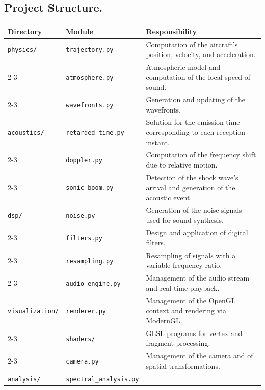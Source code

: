 \documentclass[10.5pt]{article}
\begin{document}
	\subsection{Project Structure.}
	
	\begin{table}[H]
		\centering
		\label{tab:estructura}
		\begin{tabular}{|l|p{4cm}|p{10cm}|}
			\hline
			\textbf{Directory} & \textbf{Module} & \textbf{Responsibility} \\
			\hline
			\texttt{physics/} &
			\texttt{trajectory.py} &
			Computation of the aircraft's position, velocity, and acceleration. \\
			\cline{2-3}
			&
			\texttt{atmosphere.py} &
			Atmospheric model and computation of the local speed of sound. \\
			\cline{2-3}
			&
			\texttt{wavefronts.py} &
			Generation and updating of the wavefronts. \\
			\hline
			\texttt{acoustics/} &
			\texttt{retarded\_time.py} &
			Solution for the emission time corresponding to each reception instant. \\
			\cline{2-3}
			&
			\texttt{doppler.py} &
			Computation of the frequency shift due to relative motion. \\
			\cline{2-3}
			&
			\texttt{sonic\_boom.py} &
			Detection of the shock wave's arrival and generation of the acoustic event. \\
			\hline
			\texttt{dsp/} &
			\texttt{noise.py} &
			Generation of the noise signals used for sound synthesis. \\
			\cline{2-3}
			&
			\texttt{filters.py} &
			Design and application of digital filters. \\
			\cline{2-3}
			&
			\texttt{resampling.py} &
			Resampling of signals with a variable frequency ratio. \\
			\cline{2-3}
			&
			\texttt{audio\_engine.py} &
			Management of the audio stream and real-time playback. \\
			\hline
			\texttt{visualization/} &
			\texttt{renderer.py} &
			Management of the OpenGL context and rendering via ModernGL. \\
			\cline{2-3}
			&
			\texttt{shaders/} &
			GLSL programs for vertex and fragment processing. \\
			\cline{2-3}
			&
			\texttt{camera.py} &
			Management of the camera and of spatial transformations. \\
			\hline
			\texttt{analysis/} &
			\texttt{spectral\_analysis.py} &

\end{tabular}
\end{table}
\end{document}
